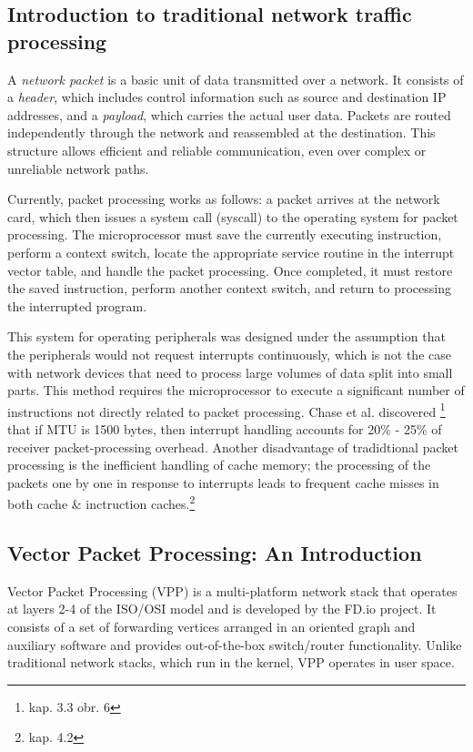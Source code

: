 \subsection{Introduction to traditional network traffic processing}
A \textit{network packet} is a basic unit of data transmitted over a network. It consists of a \textit{header}, which includes control information such as source and destination IP addresses, 
and a \textit{payload}, which carries the actual user data. 
Packets are routed independently through the network and reassembled at the destination. 
This structure allows efficient and reliable communication, even over complex or unreliable network paths.

Currently, packet processing works as follows: a packet arrives at the network card, which then
issues a system call (syscall) to the operating system for packet processing. The microprocessor
must save the currently executing instruction, perform a context switch, locate the appropriate
service routine in the interrupt vector table, and handle the packet processing. Once completed, it
must restore the saved instruction, perform another context switch, and return to processing the
interrupted program.

This system for operating peripherals was designed under the assumption that the peripherals
would not request interrupts continuously, which is not the case with network devices that need
to process large volumes of data split into small parts. 
This method requires the microprocessor to execute a significant
number of instructions not directly related to packet processing. 
Chase et al. \cite{gallatin1999trapeze} discovered \footnote{kap. 3.3 obr. 6} that if MTU is 1500 bytes, then interrupt handling accounts for 20\% - 25\% of receiver packet-processing overhead.
Another disadvantage of tradidtional packet processing is the inefficient handling of cache memory; the processing of the packets one by one in response to
interrupts leads to frequent cache misses in both cache \& inctruction caches.\footnote{kap. 4.2}\cite{cox2000profiling} 

\subsection{Vector Packet Processing: An Introduction}

Vector Packet Processing (VPP) is a multi-platform network stack that operates at layers 2-4 of the ISO/OSI model and is developed by the FD.io project. 
It consists of a set of forwarding vertices arranged in an oriented graph and auxiliary software and provides out-of-the-box switch/router functionality.
Unlike traditional network stacks, which run in the kernel, VPP operates in user space.

